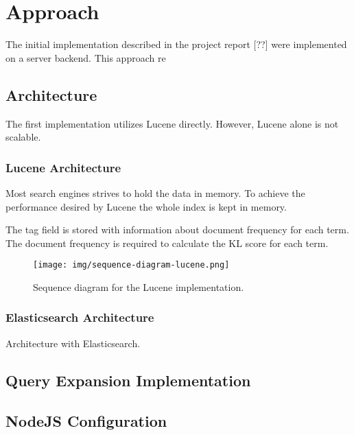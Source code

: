 \chapter{Approach}
\label{ch:approach}
The initial implementation described in the project report [??] were implemented on a server backend.
This approach re

\section{Architecture}
The first implementation utilizes Lucene directly.
However, Lucene alone is not scalable.

\subsection{Lucene Architecture}
Most search engines strives to hold the data in memory.
To achieve the performance desired by Lucene the whole index is kept in memory.

The tag field is stored with information about document frequency for each term.
The document frequency is required to calculate the KL score for each term.

\begin{figure}[h!]
\centering \texttt{[image: img/sequence-diagram-lucene.png]}
\caption{Sequence diagram for the Lucene implementation.}
\label{fig:sequence-diagram-lucene}
\end{figure}

\subsection{Elasticsearch Architecture}
Architecture with Elasticsearch.

\section{Query Expansion Implementation}

\section{NodeJS Configuration}
